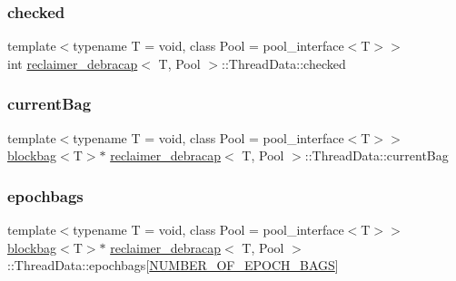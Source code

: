 \subsubsection{\texorpdfstring{checked}{checked}}
{\footnotesize\ttfamily template$<$typename T  = void, class Pool  = pool\+\_\+interface$<$\+T$>$$>$ \\
int \hyperlink{classreclaimer__debracap}{reclaimer\+\_\+debracap}$<$ T, Pool $>$\+::Thread\+Data\+::checked}

\mbox{\label{classreclaimer__debracap_1_1ThreadData_a2d41da34bc867760dc217af79f6cf34a}} 
\subsubsection{\texorpdfstring{current\+Bag}{currentBag}}
{\footnotesize\ttfamily template$<$typename T  = void, class Pool  = pool\+\_\+interface$<$\+T$>$$>$ \\
\hyperlink{classblockbag}{blockbag}$<$T$>$$\ast$ \hyperlink{classreclaimer__debracap}{reclaimer\+\_\+debracap}$<$ T, Pool $>$\+::Thread\+Data\+::current\+Bag}

\mbox{\label{classreclaimer__debracap_1_1ThreadData_ac8cb4f998e1b5dbda8452b9798810db0}} 
\subsubsection{\texorpdfstring{epochbags}{epochbags}}
{\footnotesize\ttfamily template$<$typename T  = void, class Pool  = pool\+\_\+interface$<$\+T$>$$>$ \\
\hyperlink{classblockbag}{blockbag}$<$T$>$$\ast$ \hyperlink{classreclaimer__debracap}{reclaimer\+\_\+debracap}$<$ T, Pool $>$\+::Thread\+Data\+::epochbags\mbox{[}\hyperlink{reclaimer__ebr__tree__q_8h_acc0cc9ce1a68a29c4e0e126887b517dd}{N\+U\+M\+B\+E\+R\+\_\+\+O\+F\+\_\+\+E\+P\+O\+C\+H\+\_\+\+B\+A\+GS}\mbox{]}}


